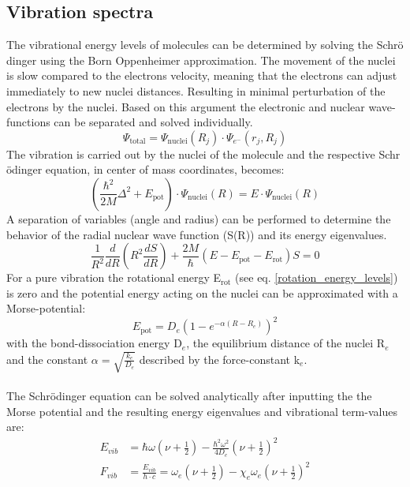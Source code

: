 \subsection{Vibration spectra}
The vibrational energy levels of molecules can be determined by solving the Schr$\text{\"o}$dinger using the Born Oppenheimer approximation. The movement of the nuclei is slow compared to the electrons velocity, meaning that the electrons can adjust immediately to new nuclei distances. Resulting in minimal perturbation of the electrons by the nuclei. Based on this argument the electronic and nuclear wave-functions can be separated and solved individually.
 \begin{equation}
\Psi_{\text{total}} = \Psi_{\text{nuclei}}(R_j)\cdot \Psi_{e^-}(r_j,R_j)
\label{Born-oppenheimer}
\end{equation}
The vibration is carried out by the nuclei of the molecule and the respective Schr$\text{\"o}$dinger equation, in center of mass coordinates, becomes:
\begin{equation}
\left( \frac{\hbar^2}{2 M} \Delta^2 + E_{\text{pot}}\right) \cdot \Psi_{\text{nuclei}}(R) = E \cdot \Psi_{\text{nuclei}}(R)
\label{Schroedinger-equation-vibration_1}
\end{equation}
A separation of variables (angle and radius) can be performed to determine the behavior of the radial nuclear wave function (S(R)) and its energy eigenvalues.
\begin{equation}
\frac{1}{R^2} \frac{d}{dR} \left(R^2 \frac{dS}{dR} \right) +\frac{2 M}{\hbar}\left(E-E_{\text{pot}} -E_{\text{rot}} \right) S = 0
\label{Schroedinger-equation-vibration_2}
\end{equation}
For a pure vibration the rotational energy E$_{\text{rot}}$ (see eq. \ref{rotation_energy_levels}) is zero and the potential energy acting on the nuclei can be approximated with a Morse-potential:
\begin{equation}
E_{\text{pot}} = D_e\left(1-e^{-\alpha(R-R_e)}\right)^2
\label{Morse-potential}
\end{equation}
with the bond-dissociation energy D$_e$, the equilibrium distance of the nuclei R$_e$ and the constant $\alpha= \sqrt{\frac{k_e}{D_e}}$ described by the force-constant k$_e$.\\\\ The Schrödinger equation can be solved analytically after inputting the the Morse potential and the resulting energy eigenvalues and vibrational term-values are:
 \begin{align}
E_{vib} &= \hbar \omega (\nu +\frac{1}{2}) - \frac{\hbar^2 \omega^2}{4 D_e} (\nu +\frac{1}{2})^2 \\
F_{vib}&= \frac{E_{vib}}{h\cdot c} = \omega_e (\nu +\frac{1}{2}) - \chi_e \omega_e (\nu +\frac{1}{2})^2 
 \label{vibration_energy_eigenvalues}
 \end{align}

